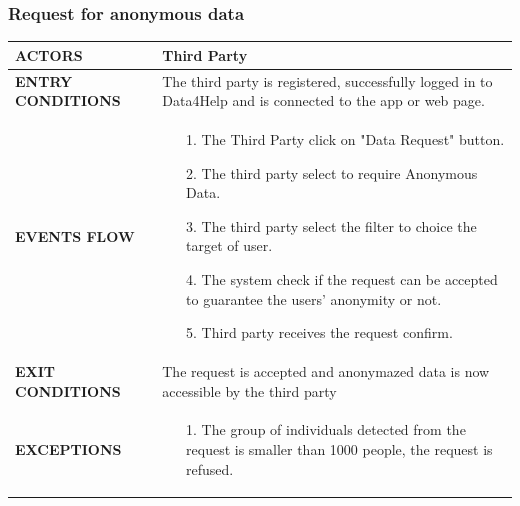 \documentclass[a4paper]{article}
\begin{document}
\vspace{1cm}

\subsubsection{Request for anonymous data}
\begin{center}
    \begin{tabular}{l || p{8cm} ||}
        \bf{ACTORS} & Third Party \\ \hline
        \bf{ENTRY CONDITIONS} & The third party is registered, successfully logged in to Data4Help and is connected to the app or web page.\\ \hline
        \bf{EVENTS FLOW} & \begin{itemize}[noitemsep, topsep=0cm, leftmargin=*] \vspace{-0.2cm}
            \item[1.] The Third Party click on "Data Request" button.
            \item[2.] The third party select to require Anonymous Data.
            \item[3.] The third party select the filter to choice the target of user.
            \item[4.] The system check if the request can be accepted to guarantee the users' anonymity or not.
            \item[5.] Third party receives the request confirm.
        \end{itemize}
        \\ \hline
        \bf{EXIT CONDITIONS} & The request is accepted and anonymazed data is now accessible by the third party\\ \hline
        \bf{EXCEPTIONS} &\begin{itemize}[noitemsep, topsep=0cm, leftmargin=*] \vspace{-0.2cm}
            \item[1.] The group of individuals detected from the request is smaller than 1000 people, the request is refused.
        \end{itemize}
        \\ \hline \hline
    \end{tabular}
\end{center}

\vspace{1cm}
\end{document}
